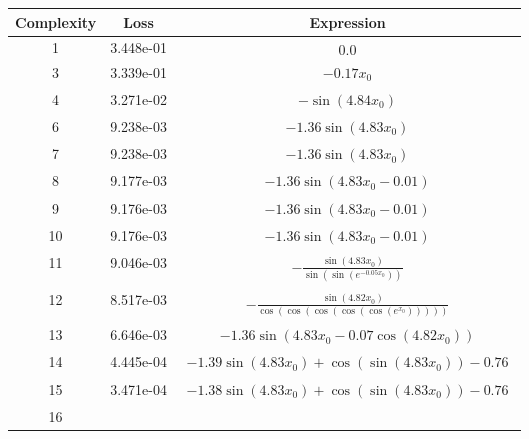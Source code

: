 \begin{center}
        \begin{tabular}{|c|c|c|}
        \hline
        Complexity & Loss & Expression \\
        \hline
        1 & 3.448e-01 & $\begin{aligned}0.0\end{aligned}$\\ \hline3 & 3.339e-01 & $\begin{aligned}- 0.17 x_{0}\end{aligned}$\\ \hline4 & 3.271e-02 & $\begin{aligned}- \sin{\left(4.84 x_{0} \right)}\end{aligned}$\\ \hline6 & 9.238e-03 & $\begin{aligned}- 1.36 \sin{\left(4.83 x_{0} \right)}\end{aligned}$\\ \hline7 & 9.238e-03 & $\begin{aligned}- 1.36 \sin{\left(4.83 x_{0} \right)}\end{aligned}$\\ \hline8 & 9.177e-03 & $\begin{aligned}- 1.36 \sin{\left(4.83 x_{0} - 0.01 \right)}\end{aligned}$\\ \hline9 & 9.176e-03 & $\begin{aligned}- 1.36 \sin{\left(4.83 x_{0} - 0.01 \right)}\end{aligned}$\\ \hline10 & 9.176e-03 & $\begin{aligned}- 1.36 \sin{\left(4.83 x_{0} - 0.01 \right)}\end{aligned}$\\ \hline11 & 9.046e-03 & $\begin{aligned}- \frac{\sin{\left(4.83 x_{0} \right)}}{\sin{\left(\sin{\left(e^{- 0.05 x_{0}} \right)} \right)}}\end{aligned}$\\ \hline12 & 8.517e-03 & $\begin{aligned}- \frac{\sin{\left(4.82 x_{0} \right)}}{\cos{\left(\cos{\left(\cos{\left(\cos{\left(\cos{\left(e^{x_{0}} \right)} \right)} \right)} \right)} \right)}}\end{aligned}$\\ \hline13 & 6.646e-03 & $\begin{aligned}- 1.36 \sin{\left(4.83 x_{0} - 0.07 \cos{\left(4.82 x_{0} \right)} \right)}\end{aligned}$\\ \hline14 & 4.445e-04 & $\begin{aligned}- 1.39 \sin{\left(4.83 x_{0} \right)} + \cos{\left(\sin{\left(4.83 x_{0} \right)} \right)} - 0.76\end{aligned}$\\ \hline15 & 3.471e-04 & $\begin{aligned}- 1.38 \sin{\left(4.83 x_{0} \right)} + \cos{\left(\sin{\left(4.83 x_{0} \right)} \right)} - 0.76\end{aligned}$\\ \hline16 
\end{tabular}
\end{center}
